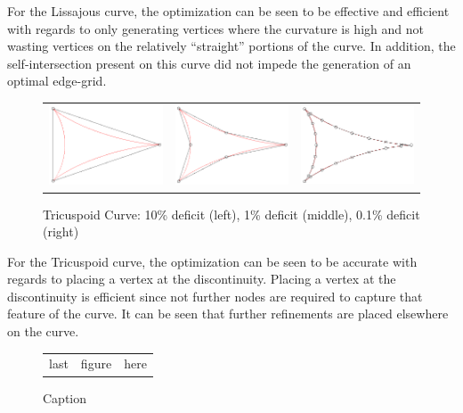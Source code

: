 For the Lissajous curve, the optimization can be seen to be effective and efficient with regards to only generating vertices where the curvature is high and not wasting vertices on the relatively ``straight'' portions of the curve. In addition, the self-intersection present on this curve did not impede the generation of an optimal edge-grid.

\begin{figure}[h!]
  \centering
  \begin{tabular}{ccc}
  \includegraphics[width=0.3\linewidth]{Figures/tricuspoid01.png} &
  \includegraphics[width=0.3\linewidth]{Figures/tricuspoid001.png} &
  \includegraphics[width=0.3\linewidth]{Figures/tricuspoid0001.png}
  \end{tabular}
  \caption{\label{fig:tricuspoid} Tricuspoid Curve: 10\% deficit (left), 1\% deficit (middle), 0.1\% deficit (right)}
\end{figure}

For the Tricuspoid curve, the optimization can be seen to be accurate with regards to placing a vertex at the discontinuity. Placing a vertex at the discontinuity is efficient since not further nodes are required to capture that feature of the curve. It can be seen that further refinements are placed elsewhere on the curve.

\begin{figure}[h!]
  \centering
  \begin{tabular}{ccc}
  last & figure & here
  \end{tabular}
  \caption{\label{fig:lastfigure} Caption}
\end{figure}

